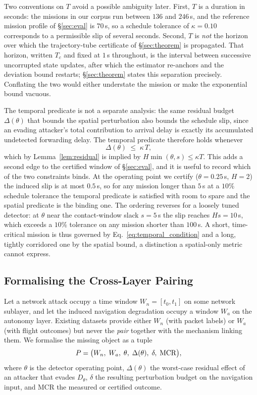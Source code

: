 Two conventions on $T$ avoid a possible ambiguity later. First, $T$ is a
duration in seconds: the missions in our corpus run between $136$ and $246$\,s,
and the reference mission profile of \S\ref{sec:eval} is $70$\,s, so a schedule
tolerance of $\kappa=0.10$ corresponds to a permissible slip of several seconds.
Second, $T$ is \emph{not} the horizon over which the trajectory-tube certificate
of \S\ref{sec:theorem} is propagated. That horizon, written $T_c$ and fixed at
$1$\,s throughout, is the interval between successive uncorrupted state updates,
after which the estimator re-anchors and the deviation bound restarts;
\S\ref{sec:theorem} states this separation precisely. Conflating the two would
either understate the mission or make the exponential bound vacuous.

The temporal predicate is not a separate analysis: the same residual budget
$\Delta(\theta)$ that bounds the spatial perturbation also bounds the schedule
slip, since an evading attacker's total contribution to arrival delay is exactly
its accumulated undetected forwarding delay. The temporal predicate therefore
holds whenever
\begin{equation}
\label{eq:temporal_condition}
\Delta(\theta)\;\le\;\kappa\,T ,
\end{equation}
which by Lemma~\ref{lem:residual} is implied by $H\min(\theta,s)\le\kappa T$.
This adds a second edge to the certified window of \S\ref{sec:eval}, and it is useful to record which of the two
constraints binds. At the operating point we certify
($\theta=0.25$\,s, $H=2$) the induced slip is at most $0.5$\,s, so for any
mission longer than $5$\,s at a $10\%$ schedule tolerance the temporal predicate
is satisfied with room to spare and the spatial predicate is the binding one.
The ordering reverses for a loosely tuned detector: at $\theta$ near the
contact-window slack $s=5$\,s the slip reaches $H s = 10$\,s, which exceeds a
$10\%$ tolerance on any mission shorter than $100$\,s. A short, time-critical
mission is thus governed by Eq.~\eqref{eq:temporal_condition} and a long,
tightly corridored one by the spatial bound, a distinction a spatial-only
metric cannot express.

\subsection{Formalising the Cross-Layer Pairing}
\label{sec:formulation}
Let a network attack occupy a time window $W_n=[t_0,t_1]$ on some network
sublayer, and let the induced navigation degradation occupy a window $W_a$ on
the autonomy layer. Existing datasets provide either $W_n$ (with packet labels)
or $W_a$ (with flight outcomes) but never the \emph{pair} together with the
mechanism linking them. We formalise the missing object as a tuple
\begin{equation}
\label{eq:pairing}
P = \big(W_n,\; W_a,\; \theta,\; \Delta(\theta),\; \delta,\; \mathrm{MCR}\big),
\end{equation}
where $\theta$ is the detector operating point, $\Delta(\theta)$ the worst-case
residual effect of an attacker that evades $D_\theta$, $\delta$ the resulting
perturbation budget on the navigation input, and MCR the measured or certified
outcome.

